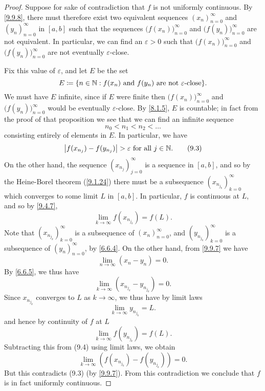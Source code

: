 \begin{proof}
  Suppose for sake of contradiction that \(f\) is not uniformly continuous.
  By \cref{9.9.8}, there must therefore exist two equivalent sequences \((x_n)_{n = 0}^\infty\) and \((y_n)_{n = 0}^\infty\) in \([a, b]\) such that the sequences \(\big(f(x_n)\big)_{n = 0}^\infty\) and \(\big(f(y_n)\big)_{n = 0}^\infty\) are not equivalent.
  In particular, we can find an \(\varepsilon > 0\) such that \(\big(f(x_n)\big)_{n = 0}^\infty\) and \(\big(f(y_n)\big)_{n = 0}^\infty\) are not eventually \(\varepsilon\)-close.

  Fix this value of \(\varepsilon\), and let \(E\) be the set
  \[
    E \coloneqq \{n \in \mathbb{N} : f(x_n) \text{ and } f(y_n) \text{ are not \(\varepsilon\)-close}\}.
  \]
  We must have \(E\) infinite, since if \(E\) were finite then \(\big(f(x_n)\big)_{n = 0}^\infty\) and \(\big(f(y_n)\big)_{n = 0}^\infty\) would be eventually \(\varepsilon\)-close.
  By \cref{8.1.5}, \(E\) is countable;
  in fact from the proof of that proposition we see that we can find an infinite sequence
  \[
    n_0 < n_1 < n_2 < \dots
  \]
  consisting entirely of elements in \(E\).
  In particular, we have
  \[
    \left\lvert f(x_{n_j}) - f(y_{n_j})\right\rvert > \varepsilon \text{ for all } j \in \mathbb{N}. \tag{9.3}\label{eq 9.3}
  \]
  On the other hand, the sequence \((x_{n_j})_{j = 0}^\infty\) is a sequence in \([a, b]\), and so by the Heine-Borel theorem (\cref{9.1.24}) there must be a subsequence \((x_{n_{j_k}})_{k = 0}^\infty\) which converges to some limit \(L\) in \([a, b]\).
  In particular, \(f\) is continuous at \(L\), and so by \cref{9.4.7},
  \[
    \lim_{k \to \infty} f(x_{n_{j_k}}) = f(L). \tag{9.4}\label{eq 9.4}
  \]
  Note that \((x_{n_{j_k}})_{k = 0}^\infty\) is a subsequence of \((x_n)_{n = 0}^\infty\), and \((y_{n_{j_k}})_{k = 0}^\infty\) is a subsequence of \((y_n)_{n = 0}^\infty\), by \cref{6.6.4}.
  On the other hand, from \cref{9.9.7} we have
  \[
    \lim_{n \to \infty} (x_n - y_n) = 0.
  \]
  By \cref{6.6.5}, we thus have
  \[
    \lim_{k \to \infty} (x_{n_{j_k}} - y_{n_{j_k}}) = 0.
  \]
  Since \(x_{n_{j_k}}\) converges to \(L\) as \(k \to \infty\), we thus have by limit laws
  \[
    \lim_{k \to \infty} y_{n_{j_k}} = L.
  \]
  and hence by continuity of \(f\) at \(L\)
  \[
    \lim_{k \to \infty} f(y_{n_{j_k}}) = f(L).
  \]
  Subtracting this from (9.4) using limit laws, we obtain
  \[
    \lim_{k \to \infty} (f(x_{n_{j_k}}) - f(y_{n_{j_k}})) = 0.
  \]
  But this contradicts (9.3) (by \cref{9.9.7}).
  From this contradiction we conclude that \(f\) is in fact uniformly continuous.
\end{proof}

